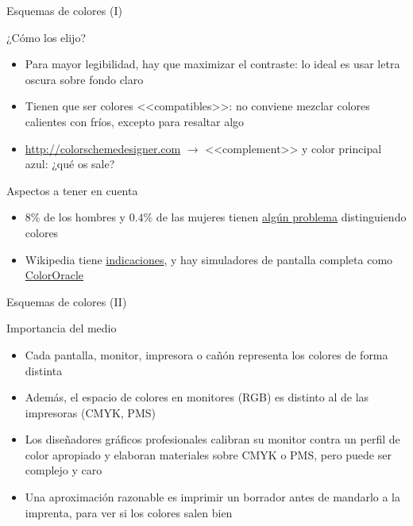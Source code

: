 \documentclass[xcolor=svgnames,compress]{beamer}
\begin{document}
\begin{frame}{Esquemas de colores (I)}

  \begin{block}{¿Cómo los elijo?}
    \begin{itemize}
    \item Para mayor legibilidad, hay que maximizar el contraste: lo
      ideal es usar letra oscura sobre fondo claro
    \item Tienen que ser colores <<compatibles>>: no conviene mezclar
      colores calientes con fríos, excepto para resaltar algo
    \item \url{http://colorschemedesigner.com} $\rightarrow$
      <<complement>> y color principal azul: ¿qué os sale?
    \end{itemize}
  \end{block}

  \begin{block}{Aspectos a tener en cuenta}
    \begin{itemize}
    \item 8\% de los hombres y $0.4$\% de las mujeres tienen
      \href{http://en.wikipedia.org/wiki/Color_blindness\#cite_note-Howard_Hughes_Medical_Institute-28}{algún
        problema} distinguiendo colores
    \item Wikipedia tiene
      \href{http://en.wikipedia.org/wiki/Category:Articles_with_images_not_understandable_by_color_blind_users\#Tips_for_editors}{indicaciones},
      y hay simuladores de pantalla completa como
      \href{http://colororacle.org/}{ColorOracle}
    \end{itemize}
  \end{block}

\end{frame}

\begin{frame}{Esquemas de colores (II)}

  \begin{block}{Importancia del medio}
    \begin{itemize}
    \item Cada pantalla, monitor, impresora o cañón representa los
      colores de forma distinta
    \item Además, el espacio de colores en monitores (RGB) es distinto
      al de las impresoras (CMYK, PMS)
    \item Los diseñadores gráficos profesionales calibran su monitor
      contra un perfil de color apropiado y elaboran materiales sobre
      CMYK o PMS, pero puede ser complejo y caro
    \item Una aproximación razonable es imprimir un borrador antes de
      mandarlo a la imprenta, para ver si los colores salen bien
    \end{itemize}
  \end{block}
  
\end{frame}
\end{document}
